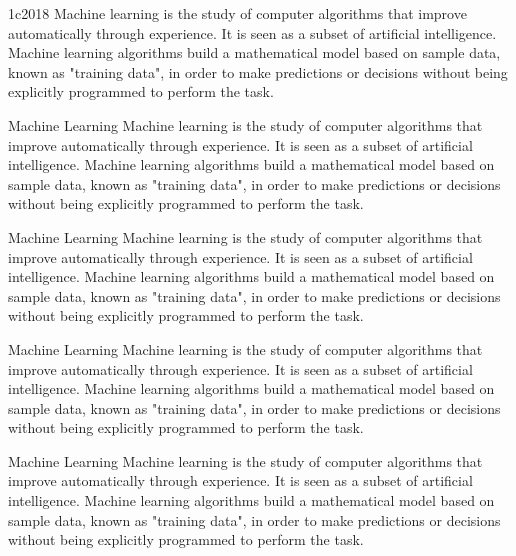 \documentclass{report}
\begin{document}
\begin{exambox}{1c}{2018}
    Machine learning is the study of computer algorithms that improve automatically through experience. It is seen as a subset of artificial intelligence. Machine learning algorithms build a mathematical model based on sample data, known as "training data", in order to make predictions or decisions without being explicitly programmed to perform the task.
\end{exambox}


\begin{commentbox}{Machine Learning}
    Machine learning is the study of computer algorithms that improve automatically through experience. It is seen as a subset of artificial intelligence. Machine learning algorithms build a mathematical model based on sample data, known as "training data", in order to make predictions or decisions without being explicitly programmed to perform the task.
\end{commentbox}

\begin{theorembox}{Machine Learning}
    Machine learning is the study of computer algorithms that improve automatically through experience. It is seen as a subset of artificial intelligence. Machine learning algorithms build a mathematical model based on sample data, known as "training data", in order to make predictions or decisions without being explicitly programmed to perform the task.    
\end{theorembox}

\begin{referencebox}{Machine Learning}
    Machine learning is the study of computer algorithms that improve automatically through experience. It is seen as a subset of artificial intelligence. Machine learning algorithms build a mathematical model based on sample data, known as "training data", in order to make predictions or decisions without being explicitly programmed to perform the task.    
\end{referencebox}

\begin{intuitbox}{Machine Learning}
    Machine learning is the study of computer algorithms that improve automatically through experience. It is seen as a subset of artificial intelligence. Machine learning algorithms build a mathematical model based on sample data, known as "training data", in order to make predictions or decisions without being explicitly programmed to perform the task.    
\end{intuitbox}


\end{document}
